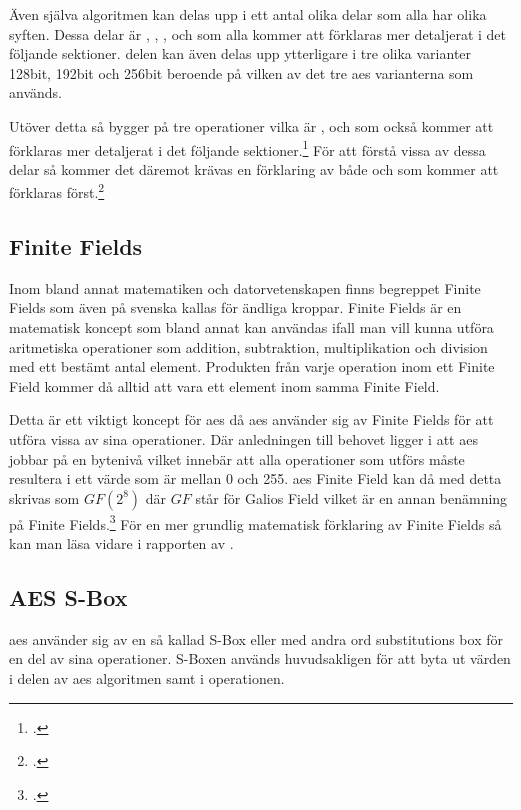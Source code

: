 Även själva algoritmen kan delas upp i ett antal olika delar som alla har olika syften. Dessa delar är , , ,
 och  som alla kommer att förklaras mer detaljerat i det följande sektioner.  delen kan även
delas upp ytterligare i tre olika varianter 128bit, 192bit och 256bit beroende på vilken av det tre \acrshort{aes} varianterna som används.

Utöver detta så bygger  på tre operationer vilka är ,  och
 som också kommer att förklaras mer detaljerat i det följande sektioner.\footcite{aes_wiki} För att förstå vissa av dessa delar
så kommer det däremot krävas en förklaring av både  och  som kommer att förklaras först.\footcite{daemen1999aes}

\subsection{Finite Fields}
\label{sec:finite-fields}
Inom bland annat matematiken och datorvetenskapen finns begreppet Finite Fields
som även på svenska kallas för ändliga kroppar. Finite Fields är en matematisk
koncept som bland annat kan användas ifall man vill kunna utföra aritmetiska
operationer som addition, subtraktion, multiplikation och division med ett
bestämt antal element. Produkten från varje operation inom ett Finite Field
kommer då alltid att vara ett element inom samma Finite Field.

Detta är ett viktigt koncept för \acrshort{aes} då \acrshort{aes} använder sig av
Finite Fields för att utföra vissa av sina operationer. Där anledningen till behovet
ligger i att \acrshort{aes} jobbar på en bytenivå vilket innebär att alla operationer
som utförs måste resultera i ett värde som är mellan 0 och 255. \acrshort{aes} Finite Field
kan då med detta skrivas som $GF(2^8)$ där $GF$ står för Galios Field vilket är
en annan benämning på Finite Fields.\footcite{finitefield_wiki} För en mer grundlig matematisk förklaring av Finite Fields så kan man läsa vidare i rapporten
 av \citeauthor{boman2016andliga}.

\subsection{AES S-Box}
\label{sec:aes-sbox}
\acrshort{aes} använder sig av en så kallad S-Box eller med andra ord substitutions box
för en del av sina operationer. S-Boxen används huvudsakligen för att byta ut värden
i  delen av \acrshort{aes} algoritmen samt i
 operationen.

